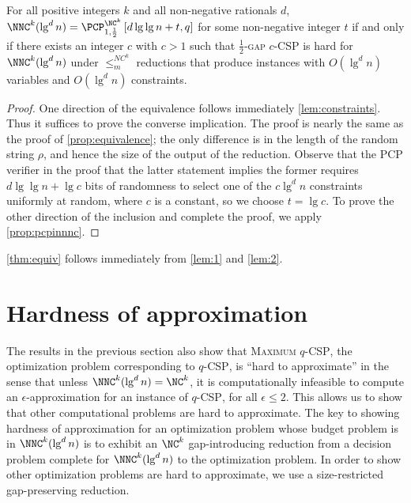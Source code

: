 \documentclass[]{article}
\newcommand{\PCPcs}[5]{\PCP^{#1}_{#2, #3}\left[#4, #5\right]}
\begin{document}
\begin{lemma}\label{lem:2}
  For all positive integers $k$ and all non-negative rationals $d$, $\NNC^k(\lg^d n) = \PCPcs{\NC^k}{1}{\frac{1}{2}}{d \lg \lg n + t}{q}$ for some non-negative integer $t$ if and only if there exists an integer $c$ with $c > 1$ such that \textsc{$\frac{1}{2}$-gap $c$-CSP} is hard for $\NNC^k(\lg^d n)$ under $\leq_m^{NC^k}$ reductions that produce instances with $O(\lg^d n)$ variables and $O(\lg^d n)$ constraints.
\end{lemma}
\begin{proof}
  One direction of the equivalence follows immediately \autoref{lem:constraints}.
  Thus it suffices to prove the converse implication.
  The proof is nearly the same as the proof of \autoref{prop:equivalence}; the only difference is in the length of the random string $\rho$, and hence the size of the output of the reduction.
  Observe that the PCP verifier in the proof that the latter statement implies the former requires $d \lg \lg n + \lg c$ bits of randomness to select one of the $c \lg^d n$ constraints uniformly at random, where $c$ is a constant, so we choose $t = \lg c$.
  To prove the other direction of the inclusion and complete the proof, we apply \autoref{prop:pcpinnnc}.
\end{proof}

\autoref{thm:equiv} follows immediately from \autoref{lem:1} and \autoref{lem:2}.

\section{Hardness of approximation}

The results in the previous section also show that \textsc{Maximum $q$-CSP}, the optimization problem corresponding to \textsc{$q$-CSP}, is ``hard to approximate'' in the sense that unless $\NNC^k(\lg^d n) = \NC^k$, it is computationally infeasible to compute an $\epsilon$-approximation for an instance of \textsc{$q$-CSP}, for all $\epsilon \leq 2$.
This allows us to show that other computational problems are hard to approximate.
The key to showing hardness of approximation for an optimization problem whose budget problem is in $\NNC^k(\lg^d n)$ is to exhibit an $\NC^k$ gap-introducing reduction from a decision problem complete for $\NNC^k(\lg^d n)$ to the optimization problem.
In order to show other optimization problems are hard to approximate, we use a size-restricted gap-preserving reduction.
\end{document}
